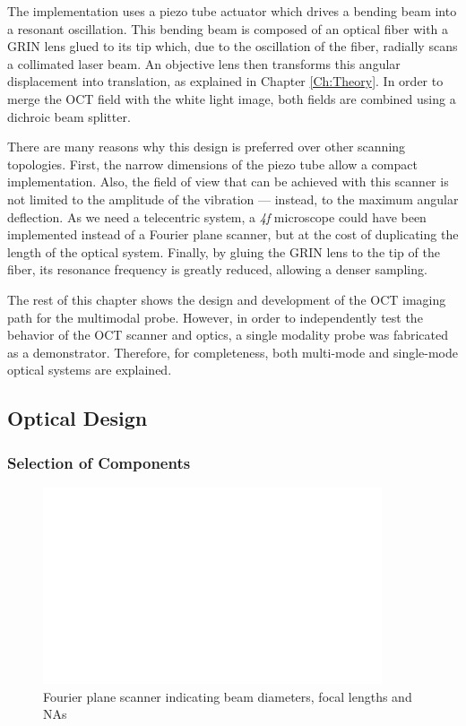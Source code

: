 The implementation uses a piezo tube actuator which drives a bending beam into a resonant oscillation. This bending beam is composed of an optical fiber with a GRIN lens glued to its tip which, due to the oscillation of the fiber, radially scans a collimated laser beam. An objective lens then transforms this angular displacement into translation, as explained in Chapter \ref{Ch:Theory}. In order to merge the OCT field with the white light image, both fields are combined using a dichroic beam splitter.

There are many reasons why this design is preferred over other scanning topologies. First, the narrow dimensions of the piezo tube allow a compact implementation. Also, the field of view that can be achieved with this scanner is not limited to the amplitude of the vibration --- instead, to the maximum angular deflection. As we need a telecentric system, a \textit{4f} microscope could have been implemented instead of a Fourier plane scanner, but at the cost of duplicating the length of the optical system. Finally, by gluing the GRIN lens to the tip of the fiber, its resonance frequency is greatly reduced, allowing a denser sampling.


The rest of this chapter shows the design and development of the OCT imaging path for the multimodal probe. However, in order to independently test the behavior of the OCT scanner and optics, a single modality probe was fabricated as a demonstrator. Therefore, for completeness, both multi-mode and single-mode optical systems are explained.


\newpage
\subsection{Optical Design}

\subsubsection{Selection of Components}
\begin{figure}[h!]\centering \includegraphics[width=10cm,draft]{figures/foo.png}
      \caption{Fourier plane scanner indicating beam diameters, focal lengths and NAs}
\end{figure}

